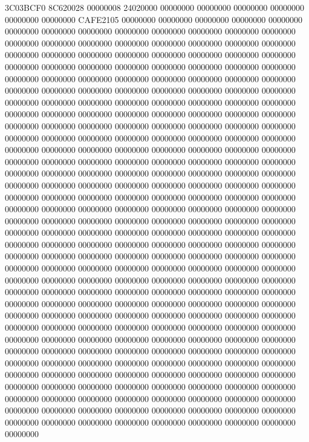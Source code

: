 3C03BCF0
8C620028
00000008
24020000
00000000
00000000
00000000
00000000
00000000
00000000
CAFE2105
00000000
00000000
00000000
00000000
00000000
00000000
00000000
00000000
00000000
00000000
00000000
00000000
00000000
00000000
00000000
00000000
00000000
00000000
00000000
00000000
00000000
00000000
00000000
00000000
00000000
00000000
00000000
00000000
00000000
00000000
00000000
00000000
00000000
00000000
00000000
00000000
00000000
00000000
00000000
00000000
00000000
00000000
00000000
00000000
00000000
00000000
00000000
00000000
00000000
00000000
00000000
00000000
00000000
00000000
00000000
00000000
00000000
00000000
00000000
00000000
00000000
00000000
00000000
00000000
00000000
00000000
00000000
00000000
00000000
00000000
00000000
00000000
00000000
00000000
00000000
00000000
00000000
00000000
00000000
00000000
00000000
00000000
00000000
00000000
00000000
00000000
00000000
00000000
00000000
00000000
00000000
00000000
00000000
00000000
00000000
00000000
00000000
00000000
00000000
00000000
00000000
00000000
00000000
00000000
00000000
00000000
00000000
00000000
00000000
00000000
00000000
00000000
00000000
00000000
00000000
00000000
00000000
00000000
00000000
00000000
00000000
00000000
00000000
00000000
00000000
00000000
00000000
00000000
00000000
00000000
00000000
00000000
00000000
00000000
00000000
00000000
00000000
00000000
00000000
00000000
00000000
00000000
00000000
00000000
00000000
00000000
00000000
00000000
00000000
00000000
00000000
00000000
00000000
00000000
00000000
00000000
00000000
00000000
00000000
00000000
00000000
00000000
00000000
00000000
00000000
00000000
00000000
00000000
00000000
00000000
00000000
00000000
00000000
00000000
00000000
00000000
00000000
00000000
00000000
00000000
00000000
00000000
00000000
00000000
00000000
00000000
00000000
00000000
00000000
00000000
00000000
00000000
00000000
00000000
00000000
00000000
00000000
00000000
00000000
00000000
00000000
00000000
00000000
00000000
00000000
00000000
00000000
00000000
00000000
00000000
00000000
00000000
00000000
00000000
00000000
00000000
00000000
00000000
00000000
00000000
00000000
00000000
00000000
00000000
00000000
00000000
00000000
00000000
00000000
00000000
00000000
00000000
00000000
00000000
00000000
00000000
00000000
00000000
00000000
00000000
00000000
00000000
00000000
00000000
00000000
00000000
00000000
00000000
00000000
00000000
00000000
00000000
00000000
00000000
00000000
00000000
00000000
00000000
00000000
00000000
00000000
00000000
00000000
00000000
00000000
00000000
00000000
00000000
00000000
00000000
00000000
00000000
00000000
00000000
00000000
00000000
00000000
00000000
